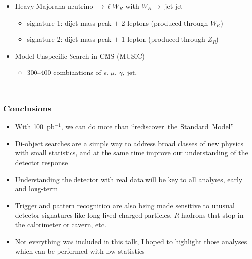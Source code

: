 \documentclass[compress]{beamer}
\begin{document}
\begin{frame}
\begin{columns}
\begin{itemize}
\item Heavy Majorana neutrino $\to \ell W_R$ with $W_R \to$ jet jet
\begin{itemize}
\item signature 1: dijet mass peak $+$ 2 leptons (produced through $W_R$)
\item signature 2: dijet mass peak $+$ 1 lepton (produced through $Z_R$)
\end{itemize}

\item Model Unspecific Search in CMS (MUSiC)
\begin{itemize}
\item 300--400 combinations of $e$, $\mu$, $\gamma$, jet, \met
\end{itemize}

\end{itemize}
\end{columns}
\label{others}
\end{frame}







\begin{frame}
\frametitle{Conclusions}

\begin{itemize}\setlength{\itemsep}{0.5 cm}
\item With 100~pb$^{-1}$, we can do more than \mbox{``rediscover the Standard Model''\hspace{-1 cm}}

\item Di-object searches are a simple way to address broad classes of
  new physics with small statistics, and at the same time improve our
  understanding of the detector response

\item Understanding the detector with real data will be key to all
  analyses, early and long-term

\item Trigger and pattern recognition are also being made sensitive to
  unusual detector signatures like long-lived charged particles,
  $R$-hadrons that stop in the calorimeter or cavern, etc.

\item Not everything was included in this talk, I hoped to highlight
  those analyses which can be performed with low statistics
\end{itemize}

\label{numpages}
\end{frame}
\end{document}
